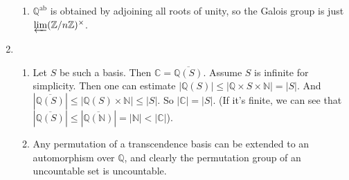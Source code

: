 \documentclass{article}
\newcommand\ZZ{\mathbb Z}
\newcommand\CC{\mathbb C}
\newcommand\QQ{\mathbb Q}
\newcommand\NN{\mathbb N}
\DeclareMathOperator\ab{ab}
\begin{document}
\begin{enumerate}
\begin{enumerate}
         \item $\QQ^{\ab}$ is obtained by adjoining all roots of unity, so the
            Galois group is just $\varprojlim (\ZZ/n\ZZ)^\times$.
      \end{enumerate}

   \item 

      \begin{enumerate}
         \item Let $S$ be such a basis. Then $\CC = \overline{\QQ(S)}$.  Assume
            $S$ is infinite for simplicity. Then one can estimate $|\QQ(S)| \leq
            |\QQ \times S \times \NN| = |S|$. And $|\overline{\QQ(S)}| \leq
            |\QQ(S) \times \NN| \leq |S|$. So $|\CC| = |S|$. (If it's finite, we
            can see that $|\overline{\QQ(S)}| \leq |\overline{\QQ(\NN)}| = |\NN|
            < |\CC|$).


         \item Any permutation of a transcendence basis can be extended to an
            automorphism over $\QQ$, and clearly the permutation group of an
            uncountable set is uncountable.
      
      \end{enumerate}

\end{enumerate}
\end{document}
